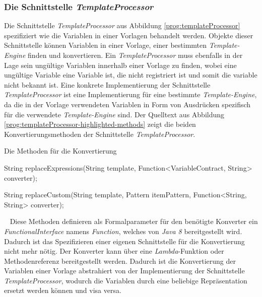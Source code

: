 \subsubsection{Die Schnittstelle \emph{TemplateProcessor}}
\label{sec:templateProcessor}
Die Schnittstelle \emph{TemplateProcessor} aus Abbildung \ref{prog:templateProcessor} spezifiziert wie die Variablen in einer Vorlagen behandelt werden. Objekte dieser Schnittstelle können Variablen in einer Vorlage, einer bestimmten \emph{Template-Engine} finden und konvertieren. Ein \emph{TemplateProcessor} muss ebenfalls in der Lage sein ungültige Variablen innerhalb einer Vorlage zu finden, wobei eine ungültige Variable eine Variable ist, die nicht registriert ist und somit die variable nicht bekannt ist. Eine konkrete Implementierung der Schnittstelle \emph{TemplateProcessor} ist eine Implementierung für eine bestimmte \emph{Template-Engine}, da die in der Vorlage verwendeten Variablen in Form von Ausdrücken spezifisch für die verwendete \emph{Template-Engine} sind. 
\newline
\newline
Der Quelltext aus Abbildung \ref{prog:templateProcessor-highlighted-methods} zeigt die beiden Konvertierungsmethoden der Schnittstelle \emph{TemplateProcessor}.
\begin{program}[h]
\caption{Die Methoden für die Konvertierung}
\label{prog:templateProcessor-highlighted-methods}
\begin{JavaCode}[numbers=none]
String replaceExpressions(String template,
                          Function<VariableContract, String> converter);

String replaceCustom(String template,
                     Pattern itemPattern,
                     Function<String, String> converter);
\end{JavaCode}
\end{program}
\ \newline
Diese Methoden definieren als Formalparameter für den benötigte Konverter ein \emph{FunctionalInterface} namens \emph{Function}, welches von \emph{Java 8} bereitgestellt wird. Dadurch ist das Spezifizieren einer eigenen Schnittstelle für die Konvertierung nicht mehr nötig. Der Konverter kann über eine \emph{Lambda}-Funktion oder Methodenreferenz bereitgestellt werden. Dadurch ist die Konvertierung der Variablen einer Vorlage abstrahiert von der Implementierung der Schnittstelle \emph{TemplateProcessor}, wodurch die Variablen durch eine beliebige Repräsentation ersetzt werden können und visa versa.

